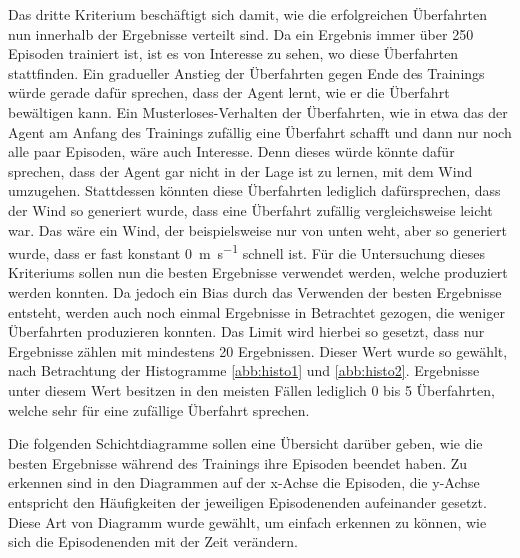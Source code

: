 \documentclass[]{iat}
\begin{document}
Das dritte Kriterium beschäftigt sich damit, wie die erfolgreichen Überfahrten nun innerhalb der Ergebnisse verteilt sind. Da ein Ergebnis immer über 250 Episoden trainiert ist, ist es von Interesse zu sehen, wo diese Überfahrten stattfinden. Ein gradueller Anstieg der Überfahrten gegen Ende des Trainings würde gerade dafür sprechen, dass der Agent lernt, wie er die Überfahrt bewältigen kann. Ein Musterloses-Verhalten der Überfahrten, wie in etwa das der Agent am Anfang des Trainings zufällig eine Überfahrt schafft und dann nur noch alle paar Episoden, wäre auch Interesse. Denn dieses würde könnte dafür sprechen, dass der Agent gar nicht in der Lage ist zu lernen, mit dem Wind umzugehen. Stattdessen könnten diese Überfahrten lediglich dafürsprechen, dass der Wind so generiert wurde, dass eine Überfahrt zufällig vergleichsweise leicht war. Das wäre ein Wind, der beispielsweise nur von unten weht, aber so generiert wurde, dass er fast konstant \SI{0}{\m\per\s} schnell ist. Für die Untersuchung dieses Kriteriums sollen nun die besten Ergebnisse verwendet werden, welche produziert werden konnten. Da jedoch ein Bias durch das Verwenden der besten Ergebnisse entsteht, werden auch noch einmal Ergebnisse in Betrachtet gezogen, die weniger Überfahrten produzieren konnten. Das Limit wird hierbei so gesetzt, dass nur Ergebnisse zählen mit mindestens 20 Ergebnissen. Dieser Wert wurde so gewählt, nach Betrachtung der Histogramme \ref{abb:histo1} und \ref{abb:histo2}. Ergebnisse unter diesem Wert besitzen in den meisten Fällen lediglich 0 bis 5 Überfahrten, welche sehr für eine zufällige Überfahrt sprechen.

Die folgenden Schichtdiagramme sollen eine Übersicht darüber geben, wie die besten Ergebnisse während des Trainings ihre Episoden beendet haben. Zu erkennen sind in den Diagrammen auf der x-Achse die Episoden, die y-Achse entspricht den Häufigkeiten der jeweiligen Episodenenden aufeinander gesetzt. Diese Art von Diagramm wurde gewählt, um einfach erkennen zu können, wie sich die Episodenenden mit der Zeit verändern.
\end{document}
